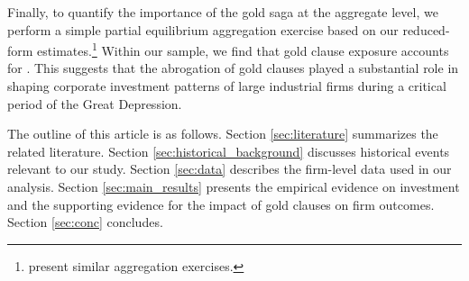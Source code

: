 Finally, to quantify the importance of the gold saga at the aggregate level, we perform a simple partial equilibrium aggregation exercise based on our reduced-form estimates.\footnote{\cite{Chodorow2013, Hausman2017, Benmelech2018} present similar aggregation exercises.} Within our sample, we find that gold clause exposure accounts for . This suggests that the abrogation of gold clauses played a substantial role in shaping corporate investment patterns of large industrial firms during a critical period of the Great Depression.

The outline of this article is as follows. Section \ref{sec:literature} summarizes the related literature. Section \ref{sec:historical_background} discusses historical events relevant to our study. Section \ref{sec:data} describes the firm-level data used in our analysis. Section \ref{sec:main_results} presents the empirical evidence on investment and the supporting evidence for the impact of gold clauses on firm outcomes. Section \ref{sec:conc} concludes.